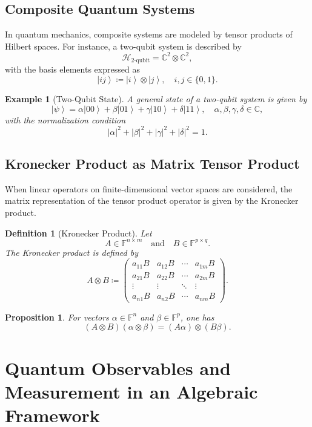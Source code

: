 \documentclass[11pt,oneside]{book}
\newtheorem{definition}{Definition}[chapter]
\newtheorem{example}{Example}[chapter]
\newtheorem{proposition}[theorem]{Proposition}
\theoremstyle{remark}
\renewcommand{\ket}[1]{\left| #1 \right\rangle}
\begin{document}
	\section{Composite Quantum Systems}
	In quantum mechanics, composite systems are modeled by tensor products of Hilbert spaces. For instance, a two-qubit system is described by
	\[
	\mathcal{H}_{\text{2-qubit}} = \mathbb{C}^2 \otimes \mathbb{C}^2,
	\]
	with the basis elements expressed as
	\[
	\ket{ij} \coloneqq \ket{i}\otimes \ket{j}, \quad i,j \in \{0,1\}.
	\]
	
	\begin{example}[Two-Qubit State]
		A general state of a two-qubit system is given by
		\[
		\ket{\psi} = \alpha \ket{00} + \beta \ket{01} + \gamma \ket{10} + \delta \ket{11}, \quad \alpha,\beta,\gamma,\delta \in \mathbb{C},
		\]
		with the normalization condition
		\[
		|\alpha|^2+|\beta|^2+|\gamma|^2+|\delta|^2=1.
		\]
	\end{example}
	
	\section{Kronecker Product as Matrix Tensor Product}
	When linear operators on finite-dimensional vector spaces are considered, the matrix representation of the tensor product operator is given by the Kronecker product.
	
	\begin{definition}[Kronecker Product]
		Let
		\[
		A \in \mathbb{F}^{n\times m} \quad \text{and} \quad B \in \mathbb{F}^{p\times q}.
		\]
		The \emph{Kronecker product} is defined by
		\[
		A \otimes B \coloneqq \begin{pmatrix}
			a_{11}B & a_{12}B & \cdots & a_{1m}B \\
			a_{21}B & a_{22}B & \cdots & a_{2m}B \\
			\vdots  & \vdots  & \ddots & \vdots  \\
			a_{n1}B & a_{n2}B & \cdots & a_{nm}B
		\end{pmatrix}.
		\]
	\end{definition}
	
	\begin{proposition}
		For vectors $\alpha\in\mathbb{F}^n$ and $\beta\in\mathbb{F}^p$, one has
		\[
		(A\otimes B)(\alpha\otimes\beta) = (A\alpha)\otimes(B\beta).
		\]
	\end{proposition}
	
	\chapter{Quantum Observables and Measurement in an Algebraic Framework}
\end{document}

